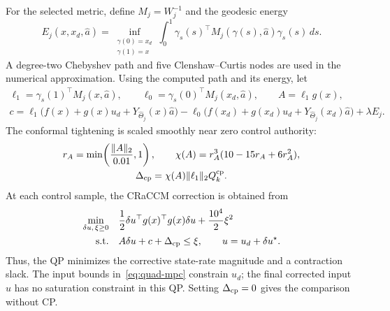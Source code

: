 \documentclass[11pt]{article}
\begin{document}
For the selected metric, define $M_j=W_j^{-1}$ and the geodesic energy
\begin{equation}\label{eq:quad-energy}
    E_j(x,x_d,\hat a)=\inf_{\substack{\gamma(0)=x_d\\\gamma(1)=x}}
       \int_0^1\gamma_s(s)^\top M_j(\gamma(s),\hat a)
           \gamma_s(s)\,ds.
\end{equation}
A degree-two Chebyshev path and five Clenshaw--Curtis nodes are used
in the numerical approximation.
Using the computed path and its energy, let
\begin{equation}
\begin{gathered}
    \ell_1=\gamma_s(1)^\top M_j(x,\hat a),\qquad
    \ell_0=\gamma_s(0)^\top M_j(x_d,\hat a),\qquad A=\ell_1g(x),\\
    c=\ell_1\big(f(x)+g(x)u_d+Y_{\hat\Theta_j}(x)\hat a\big)
       -\ell_0\big(f(x_d)+g(x_d)u_d
             +Y_{\hat\Theta_j}(x_d)\hat a\big)+\lambda E_j.
\end{gathered}
\end{equation}
The conformal tightening is scaled smoothly near zero control authority:
\begin{equation}
\begin{gathered}
    r_A=\min\!\left(\frac{\|A\|_2}{0.01},1\right),\qquad
    \chi(A)=r_A^3(10-15r_A+6r_A^2),\\
    \Delta_{\rm cp}=\chi(A)\|\ell_1\|_2Q_k^{\rm cp}.
\end{gathered}
\end{equation}
At each control sample, the CRaCCM correction is obtained from
\begin{equation}\label{eq:quad-craccm-qp}
\begin{aligned}
    \min_{\delta u,\,\xi\ge0}\quad&
       \frac12\delta u^\top g(x)^\top g(x)\delta u
       +\frac{10^4}{2}\xi^2\\
    \text{s.t.}\quad&A\delta u+c+\Delta_{\rm cp}\le\xi,
       \qquad u=u_d+\delta u^\star.
\end{aligned}
\end{equation}
Thus, the QP minimizes the corrective state-rate magnitude and a
contraction slack. The input bounds in~\eqref{eq:quad-mpc} constrain
$u_d$; the final corrected input $u$ has no saturation constraint in
this QP. Setting $\Delta_{\rm cp}=0$ gives the comparison without CP.
\end{document}
